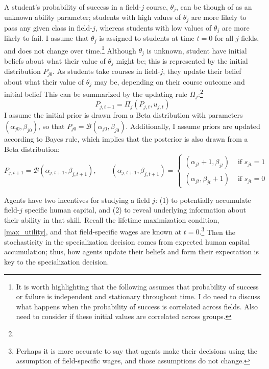 \documentclass[10 pt]{article}
\newcommand{\toedit}[1]{{\color{gray}#1}}
\newcommand{\toedit}[1]{#1}
\begin{document}
A student's probability of success in a field-$j$ course, $\theta_j$, can be though of as an unknown ability parameter; students with high values of $\theta_j$ are more likely to pass any given class in field-$j$, whereas students with low values of $\theta_j$ are more likely to fail. 
I assume that $\theta_j$ is assigned to students at time $t=0$ for all $j$ fields, and does not change over time.\footnote{
   It is worth highlighting that the following assumes that probability of success or failure is independent and stationary throughout time. \toedit{I do need to discuss what happens when the probability of success is correlated across fields. Also need to consider if these initial values are correlated across groups.}}
Although $\theta_j$ is unknown, student have initial beliefs about what their value of $\theta_j$ might be; this is represented by the initial distribution $P_{j0}$. 
As students take courses in field-$j$, they update their belief about what their value of $\theta_j$ may be, depending on their course outcome and initial belief 
\toedit{This can be summarized by the updating rule $\Pi_j$:}\footnote{}
\begin{equation*}
    P_{j,t+1} = \Pi_j (P_{j,t}, u_{j,t})
\end{equation*}
I assume the initial prior is drawn from a Beta distribution with parameters $(\alpha_{j0}, \beta_{j0})$, so that $P_{j0} = \mathcal{B} (\alpha_{j0}, \beta_{j0})$. 
Additionally, I assume priors are updated according to Bayes rule, which implies that the posterior is also drawn from a Beta distribution: 
\begin{equation*}
    P_{j,t+1} = \mathcal{B} (\alpha_{j,t+1}, \beta_{j,t+1}), \quad \quad 
    (\alpha_{j,t+1}, \beta_{j,t+1}) = 
    \begin{cases} 
        (\alpha_{jt} + 1, \beta_{jt}) &\text{ if } s_{jt} = 1 \\
        (\alpha_{jt}, \beta_{jt} + 1) &\text{ if } s_{jt} = 0
    \end{cases}
\end{equation*}

Agents have two incentives for studying a field $j$: (1) to potentially accumulate field-$j$ specific human capital, and  (2) to reveal underlying information about their ability in that skill. 
\toedit{Recall the lifetime maximization condition, \eqref{max_utility}, and that field-specific wages are known at $t=0$.}\footnote{\toedit{
    Perhaps it is more accurate to say that agents make their decisions using the assumption of field-specific wages, and those assumptions do not change. 
}} 
Then the stochasticity in the specialization decision comes from expected human capital accumulation; thus, how agents update their beliefs and form their expectation is key to the specialization decision.
\end{document}
